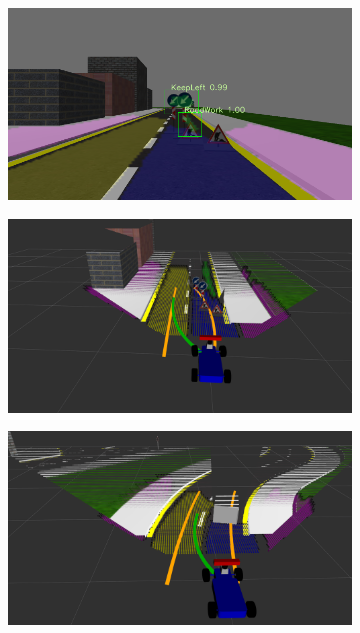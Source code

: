 \begin{figure}[h]
  \centering
  \begin{subfigure}[b]{0.45\linewidth}
      \includegraphics[width=\linewidth]{figures/experiments/construction-zone-img.png}
  \end{subfigure}
  \begin{subfigure}[b]{0.45\linewidth}
      \includegraphics[width=\linewidth]{figures/experiments/construction-zone-pc.png}
  \end{subfigure}
  \begin{subfigure}[b]{0.45\linewidth}
      \includegraphics[width=\linewidth]{figures/experiments/overtaking1-pc.png}

\end{subfigure}
\end{figure}

